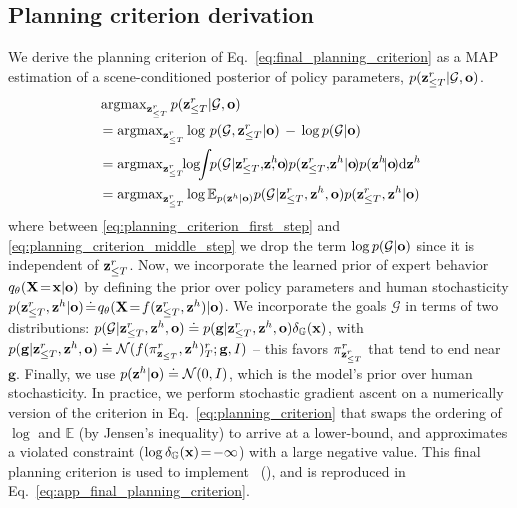 \subsection{Planning criterion derivation}
We derive the planning criterion of Eq.~\ref{eq:final_planning_criterion} as a MAP estimation of a scene-conditioned posterior of policy parameters, $p(\mathbf{z}_{\leq T}^r|\mathcal G, {\mathbf{o}})$.
\renewcommand{\CancelColor}{\color{gray}}
{
\begin{align}
    &\argmax_{\bz_{\leq T}^r} p(\bz_{\leq T}^r|\mathcal G, {\bo}) \nonumber \\
    &=\argmax_{\bz_{\leq T}^r} \log \, p(\mathcal G,\bz_{\leq T}^r|{\bo}) \,-\,
      {\log p(\mathcal G|{\bo})} 
      \label{eq:planning_criterion_first_step} \\
      &=\argmax_{\bz_{\leq T}^r} \!\! \log \!\! \int \!\! p(\mathcal G|\bz_{\leq T}^r,\!\bz^h\!\!\!, {\bo}\!)p(\bz_{\leq T}^r,\!\bz^h|{\bo}\!)p(\bz^h\!|{\bo}\!)\mathrm{d}\bz^h \label{eq:planning_criterion_middle_step}\\
      &=\argmax_{\bz_{\leq T}^r} \log \mathbb E_{p({\bz}^h|{\bo})} p(\mathcal G|\bz_{\leq T}^r,\bz^h, {\bo})p(\bz_{\leq T}^r,\bz^h|{\bo})  \label{eq:planning_criterion}
\end{align}
}%
where between \cref{eq:planning_criterion_first_step} and \cref{eq:planning_criterion_middle_step} we drop the term $\log p (\mathcal{G} | {\mathbf{o}})$ since it is independent of $\mathbf{z}_{\leq T}^r$.
%
Now, we incorporate the learned prior of expert behavior $q_\theta(\mathbf{X}\!=\!\mathbf{x}|{\mathbf{o}})$
by defining the prior over policy parameters and human stochasticity $p(\mathbf{z}_{\leq T}^r, \mathbf{z}^h|{\mathbf{o}})\!\doteq\! q_\theta(\mathbf{X}\!=\!f(\mathbf{z}^r_{\leq T}, \mathbf{z}^h)|{\mathbf{o}})$. We incorporate the goals $\mathcal G$ in terms of two distributions: $p(\mathcal G|\mathbf{z}_{\leq T}^r,\mathbf{z}^h, {\mathbf{o}})\doteq p(\mathbf{g}|\mathbf{z}_{\leq T}^r,\mathbf{z}^h,{\mathbf{o}})\delta_{\mathbb G}(\mathbf{x})$, with $p(\mathbf{g}|\mathbf{z}_{\leq T}^r,\mathbf{z}^h, {\mathbf{o}})\doteq \mathcal N(f(\pi^r_{\mathbf{z}_{\leq T}}, \mathbf{z}^h)_T^r; \mathbf{g}, I)$ -- this favors $\pi^r_{\mathbf{z}_{\leq T}^r}$ that tend to end near $\mathbf{g}$. Finally, we use $p(\mathbf{z}^h|{\mathbf{o}})\doteq \mathcal N(0, I)$, which is the model's prior over human stochasticity. In practice, we perform stochastic gradient ascent on a numerically version of the criterion in Eq.~\ref{eq:planning_criterion} that swaps the ordering of $\log$ and $\mathbb E$ (by Jensen's inequality) to arrive at a lower-bound, and approximates a violated constraint ($\log \delta_{\mathbb G}(\mathbf{x})\!=\!-\infty$) with a large negative value. This final planning criterion is used to implement \oursfull~(\ours), and is reproduced in Eq.~\ref{eq:app_final_planning_criterion}.

